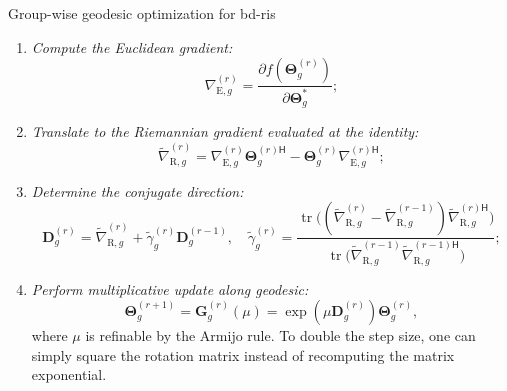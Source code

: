 \documentclass[final,xcolor={table}]{beamer}
\DeclareMathOperator{\tr}{tr}
\newlength{\colwidth}
\begin{document}
\begin{frame}[t]
\begin{columns}[t]
\begin{column}{\colwidth}
\begin{algo}{Group-wise geodesic optimization for \gls{bd}-\gls{ris}}{}
				\begin{enumerate}\color{black}
					\item \emph{Compute the Euclidean gradient:}
					\begin{equation*}
						\nabla_{\mathrm{E},g}^{(r)} = \frac{\partial f(\mathbf{\Theta}_g^{(r)})}{\partial \mathbf{\Theta}_g^*};
					\end{equation*}
					\item \emph{Translate to the Riemannian gradient evaluated at the identity:}
					\begin{equation*}
						\tilde{\nabla}_{\mathrm{R},g}^{(r)} = \nabla_{\mathrm{E},g}^{(r)} \mathbf{\Theta}_g^{(r)\mathsf{H}} - \mathbf{\Theta}_g^{(r)} {\nabla_{\mathrm{E},g}^{(r)\mathsf{H}}};
					\end{equation*}
					\item \emph{Determine the conjugate direction:}
					\begin{equation*}
						{\mathbf{D}}_g^{(r)} = \tilde{\nabla}_{\mathrm{R},g}^{(r)} + \tilde{\gamma}_g^{(r)} {\mathbf{D}}_g^{(r-1)}, \quad \tilde{\gamma}_g^{(r)} = \frac{\tr\bigl((\tilde{\nabla}_{\mathrm{R},g}^{(r)} - \tilde{\nabla}_{\mathrm{R},g}^{(r-1)}) {\tilde{\nabla}_{\mathrm{R},g}^{(r)\mathsf{H}}}\bigr)}{\tr\bigl(\tilde{\nabla}_{\mathrm{R},g}^{(r-1)} {\tilde{\nabla}_{\mathrm{R},g}^{(r-1)\mathsf{H}}}\bigr)};
					\end{equation*}
					\item \emph{Perform \textcolor{pink!50!pink!75!black}{multiplicative} update along geodesic:}
					\begin{equation*}
						\mathbf{\Theta}_g^{(r+1)} = \mathbf{G}_g^{(r)}(\mu) = \exp(\mu \mathbf{D}_g^{(r)}) \mathbf{\Theta}_g^{(r)},
					\end{equation*}
					where $\mu$ is refinable by the Armijo rule. To double the step size, one can simply square the rotation matrix instead of recomputing the matrix exponential.
				\end{enumerate}
			\end{algo}


\end{column}
\end{columns}
\end{frame}
\end{document}
